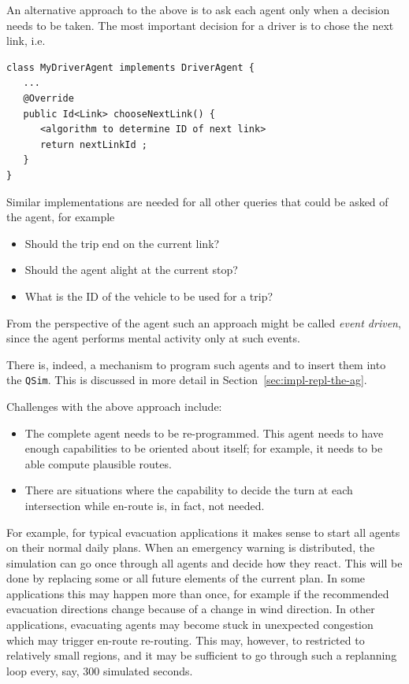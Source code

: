 An alternative approach to the above is to ask each agent only when a decision needs to be taken.  The most important decision for a driver is to chose the next link, i.e.
\begin{lstlisting}
class MyDriverAgent implements DriverAgent {
   ...
   @Override
   public Id<Link> chooseNextLink() {
      <algorithm to determine ID of next link>
      return nextLinkId ;
   }
}
\end{lstlisting}
Similar implementations are needed for all other queries that could be asked of the agent, for example
\begin{itemize}

\item Should the trip end on the current link?

\item Should the agent alight at the current stop?

\item What is the ID of the vehicle to be used for a trip?

\end{itemize}
From the perspective of the agent such an approach might be called \emph{event driven}, since the agent performs mental activity only at such events.

There is, indeed, a mechanism to program such agents and to insert
them into the \verb$QSim$.  This is discussed in more detail in
Section~\ref{sec:impl-repl-the-ag}.

Challenges with the above approach include:
\begin{itemize}

\item The complete agent needs to be re-programmed.   This agent needs to have enough capabilities to be oriented about itself; for example, it needs to be able compute plausible routes.

\item There are situations where the capability to decide the turn at each intersection while en-route is, in fact, not needed.  

\end{itemize}
For example, for typical evacuation applications it makes sense to start all agents on their normal daily plans.  When an emergency warning is distributed, the simulation can go once through all agents and decide how they react.  This will be done by replacing some or all future elements of the current plan.  In some applications this may happen more than once, for example if the recommended evacuation directions change because of a change in wind direction.  In other applications, evacuating agents may become stuck in unexpected congestion which may trigger en-route re-routing.  This may, however, to restricted to relatively small regions, and it may be sufficient to go through such a replanning loop every, say, 300 simulated seconds. 

